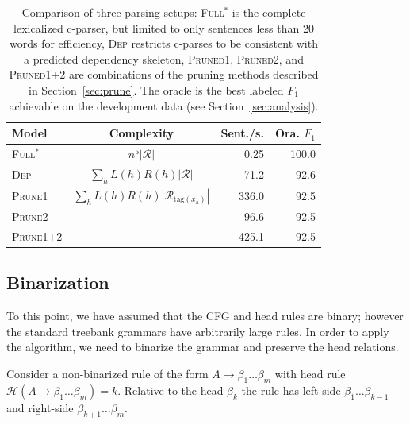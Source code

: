 \documentclass[11pt,letterpaper]{article}
\newcommand{\rules}{\mathcal{R}}
\newcommand{\TagFN}[1]{\mathrm{tag}({#1})}
\begin{document}




\begin{table}
  \centering
  \footnotesize
  \hspace*{-0.3cm}
  \begin{tabular}{|l|crr|}
    \hline
    Model & Complexity & Sent./s. & Ora. $F_1$  \\
    \hline
    \hline
    \textsc{Full$^*$} & $n^5|\rules|$ &  0.25  & 100.0  \\
    \textsc{Dep}      & $\sum_h L(h) R(h) |\rules|$ &  71.2  & 92.6    \\
    \textsc{Prune1}   & $\sum_h L(h) R(h) |\rules_{\TagFN{x_h}}|$ &  336.0 & 92.5    \\
    \textsc{Prune2}   & -- &  96.6  & 92.5 \\
    \textsc{Prune1+2} & -- &  425.1 & 92.5 \\
    \hline
  \end{tabular}

  \caption{Comparison of three parsing setups: 
    \textsc{Full$^*$} is the complete lexicalized c-parser,
    but limited to only sentences less than 20 words for efficiency,
    \textsc{Dep} restricts c-parses to be consistent with a
    predicted dependency skeleton, \textsc{Pruned1}, \textsc{Pruned2}, and \textsc{Pruned1+2}
    are combinations of the pruning methods described in
    Section~\ref{sec:prune}. The oracle is the best labeled $F_1$ achievable on the
    development data (see Section~\ref{sec:analysis}). \label{tab:alg-oracle}}
\end{table}

\subsection{Binarization}


To this point, we have assumed that the CFG and head rules are binary;
however the standard treebank grammars have arbitrarily large rules.
In order to apply the algorithm, we need to binarize the grammar and
 preserve the head relations.  

 Consider a non-binarized rule of the form $ A \rightarrow \beta_1
 \ldots \beta_m$ with head rule $\mathcal{H}(A \rightarrow \beta_1
 \ldots \beta_m) = k$. Relative to the head $\beta_k$ the rule has
 left-side $\beta_1 \ldots \beta_{k-1}$ and right-side $\beta_{k+1}
 \ldots \beta_m$.
\end{document}
